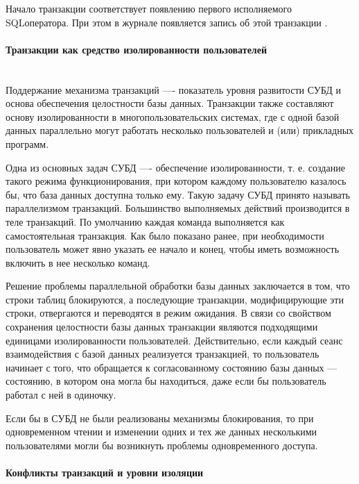 Начало транзакции соответствует появлению первого исполняемого SQLоператора. При этом в журнале появляется запись об этой транзакции \autocite{Karpova2009}.

\paragraph{Транзакции как средство изолированности пользователей} ~\\

Поддержание механизма транзакций —- показатель уровня развитости СУБД и основа обеспечения целостности базы данных. Транзакции также составляют основу изолированности в многопользовательских системах, где с одной базой данных параллельно могут работать несколько пользователей и (или) прикладных программ. 


Одна из основных задач СУБД —- обеспечение изолированности, т. е. создание такого режима функционирования, при котором каждому пользователю казалось бы, что база данных доступна только ему. Такую задачу СУБД принято называть параллелизмом транзакций. Большинство выполняемых действий производится в теле транзакций. По умолчанию каждая команда выполняется как самостоятельная транзакция. Как было показано ранее, при необходимости пользователь может явно указать ее начало и конец, чтобы иметь возможность включить в нее несколько команд.


Решение проблемы параллельной обработки базы данных заключается в том, что строки таблиц блокируются, а последующие транзакции, модифицирующие эти строки, отвергаются и переводятся в режим ожидания. В связи со свойством сохранения целостности базы данных транзакции являются подходящими единицами изолированности пользователей. Действительно, если каждый сеанс взаимодействия с базой данных реализуется транзакцией, то пользователь начинает с того, что обращается к согласованному состоянию базы данных — состоянию, в котором она могла бы находиться, даже если бы пользователь работал с ней в одиночку.


Если бы в СУБД не были реализованы механизмы блокирования, то при одновременном чтении и изменении одних и тех же данных несколькими пользователями могли бы возникнуть проблемы одновременного доступа.


\paragraph{Конфликты транзакций и уровни изоляции} ~\\

